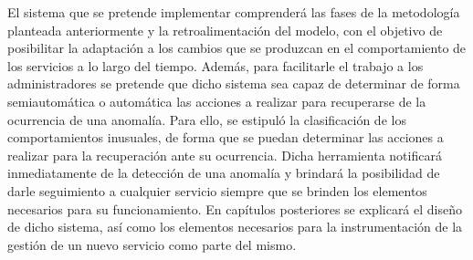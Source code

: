 El sistema que se pretende implementar comprenderá las fases de la metodología
planteada anteriormente y la retroalimentación del modelo, con el objetivo de
posibilitar la adaptación a los cambios que se produzcan en el comportamiento de
los servicios a lo largo del tiempo. Además, para facilitarle el trabajo a los
administradores se pretende que dicho sistema sea capaz de determinar de forma
semiautomática o automática las acciones a realizar para recuperarse de la
ocurrencia de una anomalía. Para ello, se estipuló la clasificación de los
comportamientos inusuales, de forma que se puedan determinar las acciones a
realizar para la recuperación ante su ocurrencia. Dicha herramienta notificará
inmediatamente de la detección de una anomalía y brindará la posibilidad de
darle seguimiento a cualquier servicio siempre que se brinden los elementos
necesarios para su funcionamiento. En capítulos posteriores se explicará el
diseño de dicho sistema, así como los elementos necesarios para la
instrumentación de la gestión de un nuevo servicio como parte del mismo.
